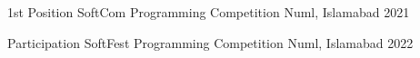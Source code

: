 



\begin{cvhonors}

  \cvhonor
    {1st Position} %
    {SoftCom Programming Competition} %
    {Numl, Islamabad} %
    {2021} %

  \cvhonor
    {Participation} %
    {SoftFest Programming Competition} %
    {Numl, Islamabad} %
    {2022} %

\end{cvhonors}